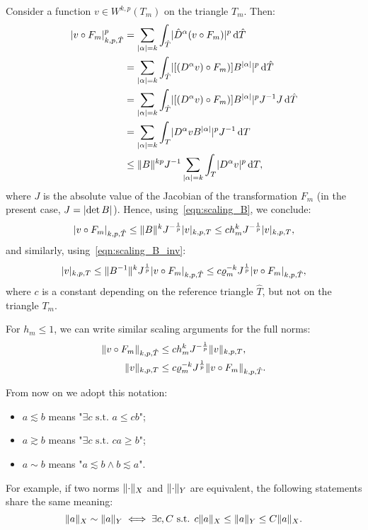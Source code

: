 Consider a function $v \in W^{k,p}(T_m)$ on the triangle $T_m$. Then:
\begin{align}
\lvert v \circ F_m\rvert^p_{k,p,\hat{T}} 
&= \sum_{\lvert\alpha\rvert = k} \int_{\hat{T}} \lvert \hat{D}^\alpha (v \circ F_m)\rvert^p \mathop{}\!\mathrm{d}\hat{T} \\
&= \sum_{\lvert\alpha\rvert = k} \int_{\hat{T}} \lvert [(D^\alpha v) \circ F_m)] B^{\lvert\alpha\rvert}\rvert^p \mathop{}\!\mathrm{d}\hat{T} \\
&= \sum_{\lvert\alpha\rvert = k} \int_{\hat{T}} \lvert [(D^\alpha v) \circ F_m)] B^{\lvert\alpha\rvert}\rvert^p J^{-1} J \mathop{}\!\mathrm{d}\hat{T} \\
&= \sum_{\lvert\alpha\rvert = k} \int_{T} \lvert D^\alpha v B^{\lvert\alpha\rvert}\rvert^p J^{-1} \mathop{}\!\mathrm{d} T \\
&\le \lVert B\rVert^{kp} J^{-1} \sum_{\lvert\alpha\rvert = k} \int_{T} \lvert D^\alpha v\rvert^p \mathop{}\!\mathrm{d} T,
\end{align}
where $J$ is the absolute value of the Jacobian of the transformation $F_m$ (in the present case, $J=\lvert\det B\rvert$). Hence, using~\eqref{eqn:scaling_B}, we conclude:
\[
\lvert v \circ F_m\rvert_{k,p,\hat{T}} \le \lVert B\rVert^k J^{-\frac{1}{p}} \lvert v\rvert_{k,p,T}
\le c h_m^k J^{-\frac{1}{p}} \lvert v\rvert_{k,p,T},
\]
and similarly, using~\eqref{eqn:scaling_B_inv}:
\[
\lvert v\rvert_{k,p,T} \le \lVert B^{-1}\rVert^k J^{\frac{1}{p}} \lvert v \circ F_m\rvert_{k,p,\hat{T}}
\le c \varrho_m^{-k} J^{\frac{1}{p}} \lvert v \circ F_m\rvert_{k,p,\hat{T}},
\]
where $c$ is a constant depending on the reference triangle $\hat{T}$, but not on the triangle $T_m$.

For $h_m \le 1$, we can write similar scaling arguments for the full norms:
\begin{align}
    \lVert v \circ F_m\rVert_{k,p,\hat{T}} & \le c h_m^k J^{-\frac{1}{p}} \lVert v\rVert_{k,p,T},\\
    \lVert v\rVert_{k,p,T} & \le c \varrho_m^{-k} J^{\frac{1}{p}} \lVert v \circ F_m\rVert_{k,p,\hat{T}}.
\end{align}

From now on we adopt this notation:
\begin{itemize}
\item $a \lesssim b$ means "$\exists c \text{ s.t. } a \le cb$";
\item $a \gtrsim b$ means "$\exists c \text{ s.t. } ca \ge b$";
\item $a \sim b$ means "$a \lesssim b \wedge b \lesssim a$".
\end{itemize}
For example, if two norms $\lVert\cdot\rVert_X$ and $\lVert\cdot\rVert_Y$ are equivalent, the following statements share the same meaning:
\[
\lVert a\rVert_X \sim \lVert a\rVert_Y \iff \exists c,C \text{ s.t. } c\lVert a\rVert_X \le \lVert a\rVert_Y \le C \lVert a\rVert_X.
\]


